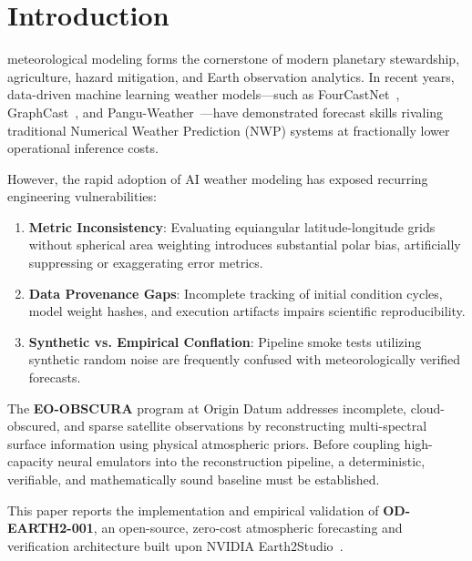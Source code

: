 \documentclass[10pt,journal,compsoc]{IEEEtran}
\begin{document}
\maketitle
\IEEEdisplaynontitleabstractindextext
\IEEEpeerreviewmaketitle

\section{Introduction}
 meteorological modeling forms the cornerstone of modern planetary stewardship, agriculture, hazard mitigation, and Earth observation analytics. In recent years, data-driven machine learning weather models---such as FourCastNet~\cite{pathak2022fourcastnet}, GraphCast~\cite{lam2023learning}, and Pangu-Weather~\cite{bi2023accurate}---have demonstrated forecast skills rivaling traditional Numerical Weather Prediction (NWP) systems at fractionally lower operational inference costs.

However, the rapid adoption of AI weather modeling has exposed recurring engineering vulnerabilities:
\begin{enumerate}
    \item \textbf{Metric Inconsistency}: Evaluating equiangular latitude-longitude grids without spherical area weighting introduces substantial polar bias, artificially suppressing or exaggerating error metrics.
    \item \textbf{Data Provenance Gaps}: Incomplete tracking of initial condition cycles, model weight hashes, and execution artifacts impairs scientific reproducibility.
    \item \textbf{Synthetic vs. Empirical Conflation}: Pipeline smoke tests utilizing synthetic random noise are frequently confused with meteorologically verified forecasts.
\end{enumerate}

The \textbf{EO-OBSCURA} program at Origin Datum addresses incomplete, cloud-obscured, and sparse satellite observations by reconstructing multi-spectral surface information using physical atmospheric priors. Before coupling high-capacity neural emulators into the reconstruction pipeline, a deterministic, verifiable, and mathematically sound baseline must be established.

This paper reports the implementation and empirical validation of \textbf{OD-EARTH2-001}, an open-source, zero-cost atmospheric forecasting and verification architecture built upon NVIDIA Earth2Studio~\cite{earth2studio2024}.
\end{document}
